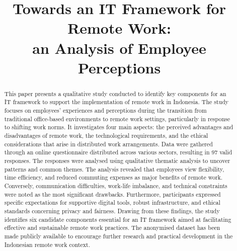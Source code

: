 \documentclass[conference]{IEEEtran}
\begin{document}
\title{Towards an IT Framework for Remote Work:\\an  Analysis of Employee Perceptions}

\author{
	\and
	\and
}


\maketitle

\begin{abstract}
	This paper presents a qualitative study conducted to identify key components for an IT framework to support the implementation of remote work in Indonesia. The study focuses on employees’ experiences and perceptions during the transition from traditional office-based environments to remote work settings, particularly in response to shifting work norms. It investigates four main aspects: the perceived advantages and disadvantages of remote work, the technological requirements, and the ethical considerations that arise in distributed work arrangements. Data were gathered through an online questionnaire distributed across various sectors, resulting in 97 valid responses. The responses were analysed using qualitative thematic analysis to uncover patterns and common themes. The analysis revealed that employees view flexibility, time efficiency, and reduced commuting expenses as major benefits of remote work. Conversely, communication difficulties, work-life imbalance, and technical constraints were noted as the most significant drawbacks. Furthermore, participants expressed specific expectations for supportive digital tools, robust infrastructure, and ethical standards concerning privacy and fairness. Drawing from these findings, the study identifies six candidate components essential for an IT framework aimed at facilitating effective and sustainable remote work practices. The anonymised dataset has been made publicly available to encourage further research and practical development in the Indonesian remote work context.
\end{abstract}
\end{document}
